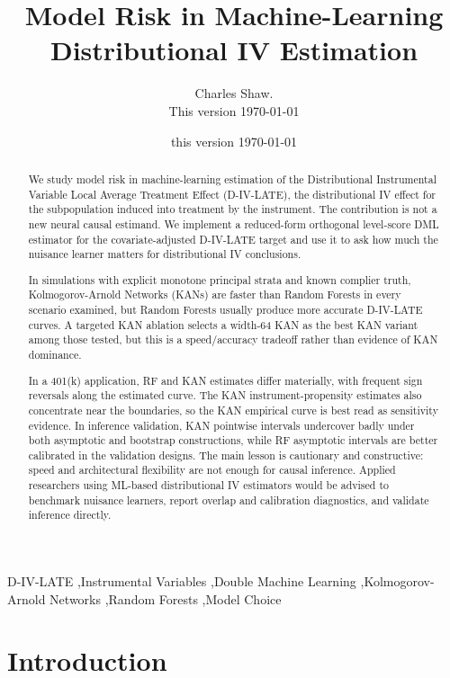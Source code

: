 \documentclass[final,3p,fleqn, 10pt]{elsarticle}
\begin{document}
\begin{frontmatter}
\title{Model Risk in Machine-Learning Distributional IV Estimation}
\author{Charles Shaw. \\This version \today}
\date{this version \today}

  \begin{abstract}
We study model risk in machine-learning estimation of the Distributional Instrumental Variable Local Average Treatment Effect (D-IV-LATE), the distributional IV effect for the subpopulation induced into treatment by the instrument. The contribution is not a new neural causal estimand. We implement a reduced-form orthogonal level-score DML estimator for the covariate-adjusted D-IV-LATE target and use it to ask how much the nuisance learner matters for distributional IV conclusions.

In simulations with explicit monotone principal strata and known complier truth, Kolmogorov-Arnold Networks (KANs) are faster than Random Forests in every scenario examined, but Random Forests usually produce more accurate D-IV-LATE curves. A targeted KAN ablation selects a width-64 KAN as the best KAN variant among those tested, but this is a speed/accuracy tradeoff rather than evidence of KAN dominance.

In a 401(k) application, RF and KAN estimates differ materially, with frequent sign reversals along the estimated curve. The KAN instrument-propensity estimates also concentrate near the boundaries, so the KAN empirical curve is best read as sensitivity evidence. In inference validation, KAN pointwise intervals undercover badly under both asymptotic and bootstrap constructions, while RF asymptotic intervals are better calibrated in the validation designs. The main lesson is cautionary and constructive: speed and architectural flexibility are not enough for causal inference. Applied researchers using ML-based distributional IV estimators would be advised to benchmark nuisance learners, report overlap and calibration diagnostics, and validate inference directly.
\end{abstract}
\begin{keyword}
D-IV-LATE \sep Instrumental Variables \sep Double Machine Learning \sep Kolmogorov-Arnold Networks \sep Random Forests \sep Model Choice
\end{keyword}
\end{frontmatter}

\section{Introduction}
\label{sec:introduction}
\end{document}
